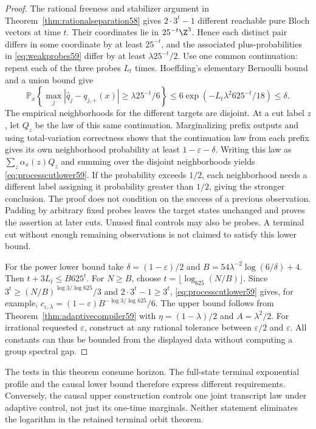 \begin{proof}
The rational freeness and stabilizer argument in
Theorem~\ref{thm:rationalseparation58} gives $2\cdot3^t-1$ different
reachable pure Bloch vectors at time $t$. Their coordinates lie in
$25^{-t}\Z^3$. Hence each distinct pair differs in some coordinate by
at least $25^{-t}$, and the associated plus-probabilities in
\eqref{eq:weakprobes59} differ by at least $\lambda25^{-t}/2$.
Use one common continuation: repeat each of the three probes $L_t$
times. Hoeffding's elementary Bernoulli bound and a union bound give
\[
 \mathbb P_x\left\{\max_j|\widehat q_j-q_{j,+}(x)|
                    \ge\lambda25^{-t}/6\right\}
 \le6\exp(-L_t\lambda^2 625^{-t}/18)\le\delta.
\]
The empirical neighborhoods for the different targets are disjoint.
At a cut label $z$, let $Q_z$ be the law of this same continuation.
Marginalizing prefix outputs and using total-variation correctness
shows that the continuation law from each prefix gives its own
neighborhood probability at least $1-\varepsilon-\delta$.
Writing this law as $\sum_z\alpha_x(z)Q_z$ and summing over the disjoint
neighborhoods yields \eqref{eq:processcutlower59}. If the probability
exceeds $1/2$, each neighborhood needs a different label assigning it
probability greater than $1/2$, giving the stronger conclusion.
The proof does not condition on the success of a previous observation.
Padding by arbitrary fixed probes leaves the target states unchanged
and proves the assertion at later cuts. Unused final controls may also
be probes. A terminal cut without enough remaining observations is not
claimed to satisfy this lower bound.

For the power lower bound take $\delta=(1-\varepsilon)/2$ and
$B=54\lambda^{-2}\log(6/\delta)+4$. Then
$t+3L_t\le B625^t$. For $N\ge B$, choose
$t=\lfloor\log_{625}(N/B)\rfloor$. Since
$3^t\ge(N/B)^{\log3/\log625}/3$ and $2\cdot3^t-1\ge3^t$,
\eqref{eq:processcutlower59} gives, for example,
$c_{\varepsilon,\lambda}=(1-\varepsilon)B^{-\log3/\log625}/6$.
The upper bound follows from Theorem~\ref{thm:adaptivecompiler59} with
$\eta=(1-\lambda)/2$ and $A=\lambda^2/2$. For irrational requested
$\varepsilon$, construct at any rational tolerance between
$\varepsilon/2$ and $\varepsilon$. All constants can thus be bounded
from the displayed data without computing a group spectral gap.
\end{proof}

The tests in this theorem consume horizon. The full-state terminal
exponential profile and the causal lower bound therefore express
different requirements. Conversely, the causal upper construction
controls one joint transcript law under adaptive control, not just its
one-time marginals. Neither statement eliminates the logarithm in the
retained terminal orbit theorem.
